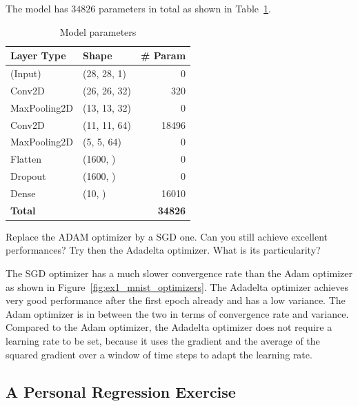 \documentclass{article}
\newenvironment{task}[1]{
  \begin{tcolorbox}[
    colback=highlight!5!white,
    colframe=highlight,
    title={Task #1}
  ]
}{
  \end{tcolorbox}
}
\begin{document}
The model has $34826$ parameters in total as shown in Table~\ref{tab:ex1_model}.

\begin{table}[ht!]
  \begin{tabular}{|l|l|r|}
    \hline
    \textbf{Layer Type} & \textbf{Shape} & \textbf{\# Param} \\ \hline
    (Input)             & (28, 28, 1)    & 0                 \\ \hline
    Conv2D              & (26, 26, 32)   & 320               \\ \hline
    MaxPooling2D        & (13, 13, 32)   & 0                 \\ \hline
    Conv2D              & (11, 11, 64)   & 18496             \\ \hline
    MaxPooling2D        & (5, 5, 64)     & 0                 \\ \hline
    Flatten             & (1600, )       & 0                 \\ \hline
    Dropout             & (1600, )       & 0                 \\ \hline
    Dense               & (10, )         & 16010             \\ \hline\hline
    \textbf{Total}      &                & \textbf{34826}    \\ \hline
  \end{tabular}
  \centering
  \caption{Model parameters}
  \label{tab:ex1_model}
\end{table}


\begin{task}{1.3.6}
  Replace the ADAM optimizer by a SGD one. Can you still achieve excellent performances? Try then
  the Adadelta optimizer. What is its particularity?
\end{task}

The SGD optimizer has a much slower convergence rate than the Adam optimizer as shown in
Figure~\ref{fig:ex1_mnist_optimizers}. The Adadelta optimizer achieves very good performance after
the first epoch already and has a low variance. The Adam optimizer is in between the two in
terms of convergence rate and variance. Compared to the Adam optimizer, the Adadelta optimizer
does not require a learning rate to be set, because it uses the gradient and the average of
the squared gradient over a window of time steps to adapt the learning rate.



\subsection{A Personal Regression Exercise}
\end{document}
